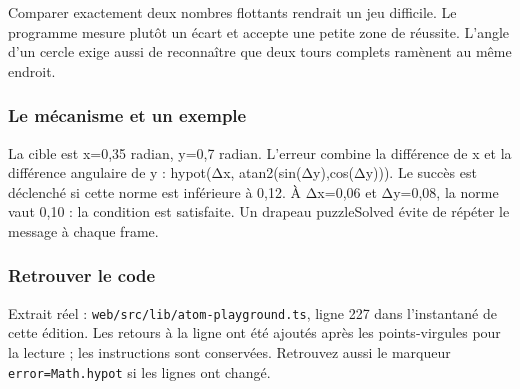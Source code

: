 \documentclass[
  canadien,
  11pt,
  letterpaper,
]{article}
\begin{document}
Comparer exactement deux nombres flottants rendrait un jeu difficile. Le
programme mesure plutôt un écart et accepte une petite zone de réussite.
L'angle d'un cercle exige aussi de reconnaître que deux tours complets
ramènent au même endroit.

\subsubsection{Le mécanisme et un
exemple}\label{le-muxe9canisme-et-un-exemple-10}

La cible est x=0,35 radian, y=0,7 radian. L'erreur combine la différence
de x et la différence angulaire de y : hypot(Δx,
atan2(sin(Δy),cos(Δy))). Le succès est déclenché si cette norme est
inférieure à 0,12. À Δx=0,06 et Δy=0,08, la norme vaut 0,10 : la
condition est satisfaite. Un drapeau puzzleSolved évite de répéter le
message à chaque frame.

\subsubsection{Retrouver le code}\label{retrouver-le-code-10}

Extrait réel : \texttt{web/src/lib/atom-playground.ts}, ligne 227 dans
l'instantané de cette édition. Les retours à la ligne ont été ajoutés
après les points-virgules pour la lecture ; les instructions sont
conservées. Retrouvez aussi le marqueur \texttt{error=Math.hypot} si les
lignes ont changé.
\end{document}
